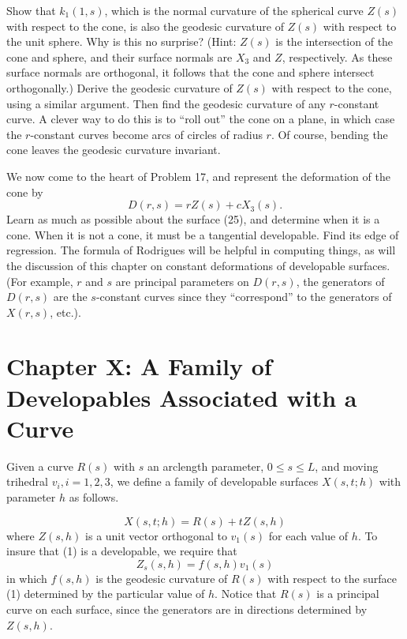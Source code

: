\documentclass{book}
\begin{document}
\begin{enumerate}
    Show that $k_{1}(1,s)$, which is the normal curvature of the spherical curve $Z(s)$ with respect to the cone, is also the geodesic curvature of $Z(s)$ with respect to the unit sphere. Why is this no surprise? (Hint: $Z(s)$ is the intersection of the cone and sphere, and their surface normals are $X_{3}$ and $Z$, respectively. As these surface normals are orthogonal, it follows that the cone and sphere intersect orthogonally.) Derive the geodesic curvature of $Z(s)$ with respect to the cone, using a similar argument. Then find the geodesic curvature of any $r$-constant curve. A clever way to do this is to ``roll out'' the cone on a plane, in which case the $r$-constant curves become arcs of circles of radius $r$. Of course, bending the cone leaves the geodesic curvature invariant.

    We now come to the heart of Problem 17, and represent the deformation of the cone by
    \begin{equation}
      D(r,s) = rZ(s) + cX_{3}(s).
    \end{equation}
    Learn as much as possible about the surface (25), and determine when it is a cone. When it is not a cone, it must be a tangential developable. Find its edge of regression. The formula of Rodrigues will be helpful in computing things, as will the discussion of this chapter on constant deformations of developable surfaces. (For example, $r$ and $s$ are principal parameters on $D(r,s)$, the generators of $D(r,s)$ are the $s$-constant curves since they ``correspond'' to the generators of $X(r,s)$, etc.).
\end{enumerate}



\chapter*{Chapter X: A Family of Developables Associated with a Curve}

\setcounter{equation}{0}

Given a curve $R(s)$ with $s$ an arclength parameter, $0 \leq s \leq L$, and moving trihedral $v_{i}, i = 1,2,3$, we define a family of developable surfaces $X(s,t;h)$ with parameter $h$ as follows.

\begin{equation}
X(s,t;h) = R(s) + tZ(s,h)
\end{equation}
where $Z(s,h)$ is a unit vector orthogonal to $v_{1}(s)$ for each value of $h$. To insure that (1) is a developable, we require that
\begin{equation}
Z_{s}(s,h) = f(s,h) v_{1}(s)
\end{equation}
in which $f(s,h)$ is the geodesic curvature of $R(s)$ with respect to the surface (1) determined by the particular value of $h$. Notice that $R(s)$ is a principal curve on each surface, since the generators are in directions determined by $Z(s,h)$.
\end{document}

